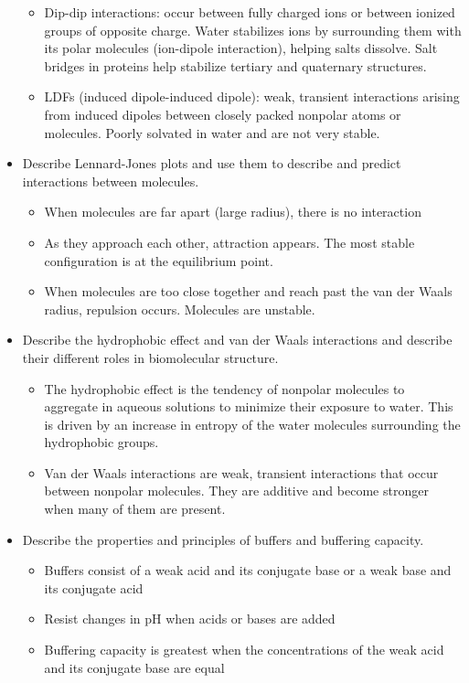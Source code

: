 \documentclass[letterpaper, 12pt]{article}
\begin{document}
\begin{itemize}
\begin{itemize}
\item Dip-dip interactions: occur between fully charged ions or between ionized groups of opposite charge. Water stabilizes ions by surrounding them with its polar molecules (ion-dipole interaction), helping salts dissolve. Salt bridges in proteins help stabilize tertiary and quaternary structures.
\item LDFs (induced dipole-induced dipole): weak, transient interactions arising from induced dipoles between closely packed nonpolar atoms or molecules. Poorly solvated in water and are not very stable.
\end{itemize}
\item Describe Lennard-Jones plots and use them to describe and predict interactions between molecules.
\begin{itemize}
\item When molecules are far apart (large radius), there is no interaction
\item As they approach each other, attraction appears. The most stable configuration is at the equilibrium point.
\item When molecules are too close together and reach past the van der Waals radius, repulsion occurs. Molecules are unstable.
\end{itemize}
\item Describe the hydrophobic effect and van der Waals interactions and describe their different roles in biomolecular structure.
\begin{itemize}
\item The hydrophobic effect is the tendency of nonpolar molecules to aggregate in aqueous solutions to minimize their exposure to water. This is driven by an increase in entropy of the water molecules surrounding the hydrophobic groups.
\item Van der Waals interactions are weak, transient interactions that occur between nonpolar molecules. They are additive and become stronger when many of them are present.
\end{itemize}
\item Describe the properties and principles of buffers and buffering capacity.
\begin{itemize}
\item Buffers consist of a weak acid and its conjugate base or a weak base and its conjugate acid
\item Resist changes in pH when acids or bases are added
\item Buffering capacity is greatest when the concentrations of the weak acid and its conjugate base are equal

\end{itemize}
\end{itemize}
\end{document}
